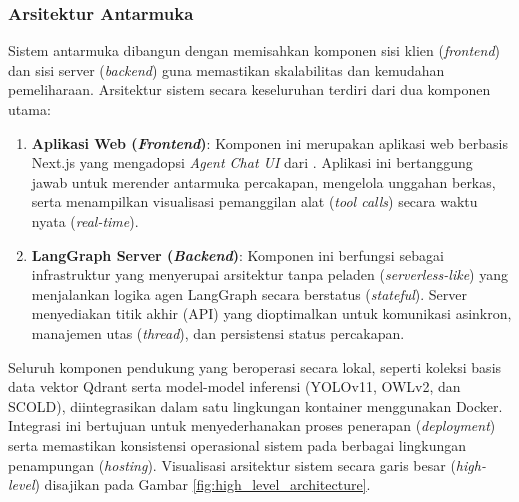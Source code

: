 \subsubsection{Arsitektur Antarmuka}
Sistem antarmuka dibangun dengan memisahkan komponen sisi klien (\textit{frontend}) dan sisi server (\textit{backend}) guna memastikan skalabilitas dan kemudahan pemeliharaan. Arsitektur sistem secara keseluruhan terdiri dari dua komponen utama:

\begin{enumerate}[nosep]
    \item \textbf{Aplikasi Web (\textit{Frontend})}: Komponen ini merupakan aplikasi web berbasis Next.js yang mengadopsi \textit{Agent Chat UI} dari \textcite{LangchainaiAgentchatui2026}. Aplikasi ini bertanggung jawab untuk merender antarmuka percakapan, mengelola unggahan berkas, serta menampilkan visualisasi pemanggilan alat (\textit{tool calls}) secara waktu nyata (\textit{real-time}).
    \item \textbf{LangGraph Server (\textit{Backend})}: Komponen ini berfungsi sebagai infrastruktur yang menyerupai arsitektur tanpa peladen (\textit{serverless-like}) yang menjalankan logika agen LangGraph secara berstatus (\textit{stateful}). Server menyediakan titik akhir (API) yang dioptimalkan untuk komunikasi asinkron, manajemen utas (\textit{thread}), dan persistensi status percakapan.
\end{enumerate}

Seluruh komponen pendukung yang beroperasi secara lokal, seperti koleksi basis data vektor Qdrant serta model-model inferensi (YOLOv11, OWLv2, dan SCOLD), diintegrasikan dalam satu lingkungan kontainer menggunakan Docker. Integrasi ini bertujuan untuk menyederhanakan proses penerapan (\textit{deployment}) serta memastikan konsistensi operasional sistem pada berbagai lingkungan penampungan (\textit{hosting}). Visualisasi arsitektur sistem secara garis besar (\textit{high-level}) disajikan pada Gambar \ref{fig:high_level_architecture}.

